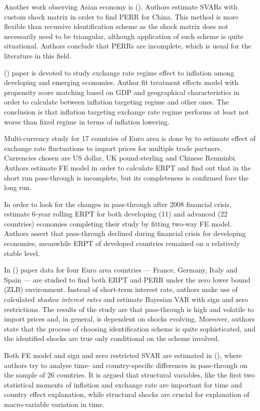 \documentclass[12pt, a4paper]{extarticle}
\begin{document}
Another work observing Asian economy is (\cite{Jiang2013}). Authors estimate SVARs with custom shock matrix in order to find PERR for China. This method is more flexible than recursive identification scheme as the shock matrix does not necessarily need to be triangular, although application of such scheme is quite situational. Authors conclude that PERRs are incomplete, which is usual for the literature in this field.

(\cite{Yamada2013}) paper is devoted to study exchange rate regime effect to inflation among developing and emerging economies. Author fit treatment effects model with propensity score matching based on GDP and geographical characteristics in order to calculate between inflation targeting regime and other ones. The conclusion is that inflation targeting exchange rate regime performs at least not worse than fixed regime in terms of inflation lowering.

Multi-currency study for 17 countries of Euro area is done by \textcite{Bandt2014} to estimate effect of exchange rate fluctuations to import prices for multiple trade partners. Currencies chosen are US dollar, UK pound-sterling and Chinese Renminbi. Authors estimate FE model in order to calculate ERPT and find out that in the short run pass-through is incomplete, but its completeness is confirmed fore the long run.

In order to look for the changes in pass-through after 2008 financial crisis, \textcite{Jasova2016} estimate 6-year rolling ERPT for both developing (11) and advanced (22 countries) economies completing their study by fitting two-way FE model. Authors assert that pass-through declined during financial crisis for developing economies, meanwhile ERPT of developed countries remained on a relatively stable level.

In (\cite{Comunale2017}) paper data for four Euro area countries --- France, Germany, Italy and Spain --- are studied to find both ERPT and PERR under the zero lower bound (ZLB) environment. Instead of short-term interest rate, authors make use of calculated \textit{shadow interest rates} and estimate Bayesian VAR with sign and zero restrictions. The results of the study are that pass-through is high and volatile to import prices and, in general, is dependent on shocks evolving. Moreover, authors state that the process of choosing identification scheme is quite sophisticated, and the identified shocks are true only conditional on the scheme involved.

Both FE model and sign and zero restricted SVAR are estimated in (\cite{Forbes2017}), where authors try to analyse time- and country-specific differences in pass-through on the sample of 26 countries. It is argued that structural variables, like the first two statistical moments of inflation and exchange rate are important for time and country effect explanation, while structural shocks are crucial for explanation of macro-variable variation in time.
\end{document}
